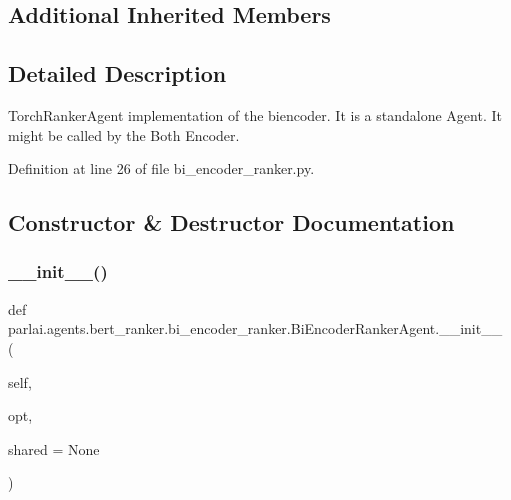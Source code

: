 \subsection*{Additional Inherited Members}


\subsection{Detailed Description}
\begin{DoxyVerb}TorchRankerAgent implementation of the biencoder.
    It is a standalone Agent. It might be called by the Both Encoder.
\end{DoxyVerb}
 

Definition at line 26 of file bi\+\_\+encoder\+\_\+ranker.\+py.



\subsection{Constructor \& Destructor Documentation}
\mbox{\label{classparlai_1_1agents_1_1bert__ranker_1_1bi__encoder__ranker_1_1BiEncoderRankerAgent_a353144d4f4c3182774913c4ddba33de9}} 
\subsubsection{\texorpdfstring{\+\_\+\+\_\+init\+\_\+\+\_\+()}{\_\_init\_\_()}}
{\footnotesize\ttfamily def parlai.\+agents.\+bert\+\_\+ranker.\+bi\+\_\+encoder\+\_\+ranker.\+Bi\+Encoder\+Ranker\+Agent.\+\_\+\+\_\+init\+\_\+\+\_\+ (\begin{DoxyParamCaption}\item[{}]{self,  }\item[{}]{opt,  }\item[{}]{shared = {\ttfamily None} }\end{DoxyParamCaption})}



